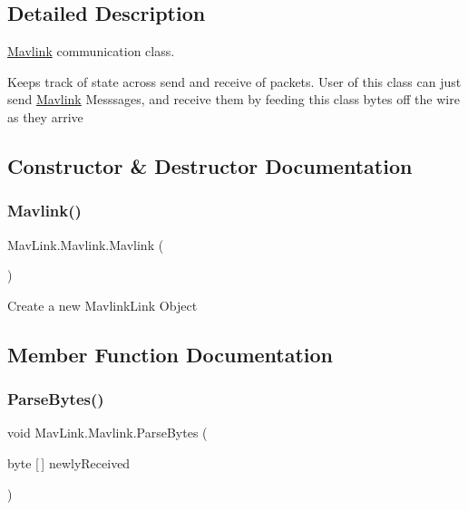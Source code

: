 \subsection{Detailed Description}
\hyperlink{classMavLink_1_1Mavlink}{Mavlink} communication class. 

Keeps track of state across send and receive of packets. User of this class can just send \hyperlink{classMavLink_1_1Mavlink}{Mavlink} Messsages, and receive them by feeding this class bytes off the wire as they arrive 

\subsection{Constructor \& Destructor Documentation}
\mbox{\label{classMavLink_1_1Mavlink_afe31f241e14b7a9df43494c3f777055f}} 
\subsubsection{\texorpdfstring{Mavlink()}{Mavlink()}}
{\footnotesize\ttfamily Mav\+Link.\+Mavlink.\+Mavlink (\begin{DoxyParamCaption}{ }\end{DoxyParamCaption})\hspace{0.3cm}{\ttfamily [inline]}}



Create a new Mavlink\+Link Object 



\subsection{Member Function Documentation}
\mbox{\label{classMavLink_1_1Mavlink_a2a1e66a440c767a640c92f00bdf5354d}} 
\subsubsection{\texorpdfstring{Parse\+Bytes()}{ParseBytes()}}
{\footnotesize\ttfamily void Mav\+Link.\+Mavlink.\+Parse\+Bytes (\begin{DoxyParamCaption}\item[{byte \mbox{[}$\,$\mbox{]}}]{newly\+Received }\end{DoxyParamCaption})\hspace{0.3cm}{\ttfamily [inline]}}





